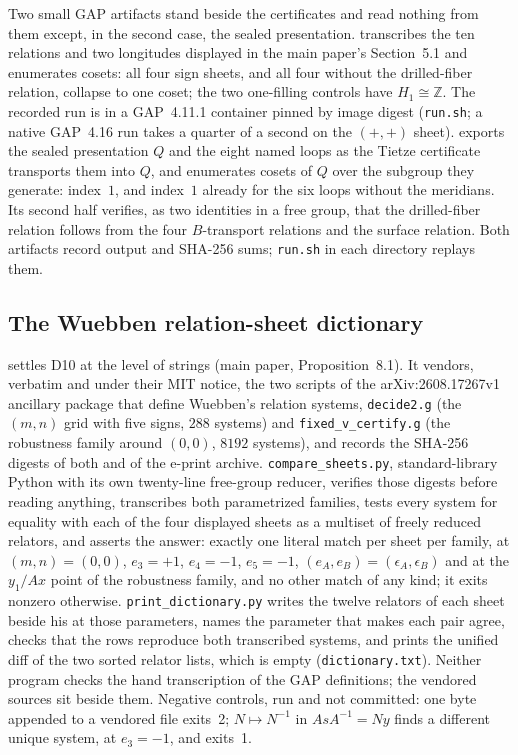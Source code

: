 \documentclass[11pt]{article}
\newcommand{\Z}{\mathbb{Z}}
\theoremstyle{definition}
\begin{document}
Two small GAP artifacts stand beside the certificates and read nothing from
them except, in the second case, the sealed presentation.
transcribes the ten relations and two longitudes displayed in the main
paper's Section~5.1 and enumerates cosets: all four sign sheets, and all
four without the drilled-fiber relation, collapse to one coset; the two
one-filling controls have $H_1\cong\Z$.  The recorded run is in a GAP~4.11.1
container pinned by image digest (\texttt{run.sh}; a native GAP~4.16 run
takes a quarter of a second on the $(+,+)$ sheet).
 exports the
sealed presentation $Q$ and the eight named loops as the Tietze certificate
transports them into $Q$, and enumerates cosets of $Q$ over the subgroup
they generate: index~$1$, and index~$1$ already for the six loops without
the meridians.  Its second half verifies, as two identities in a free group,
that the drilled-fiber relation follows from the four $B$-transport
relations and the surface relation.  Both artifacts record output and
SHA-256 sums; \texttt{run.sh} in each directory replays them.

\subsection{The Wuebben relation-sheet dictionary}
\label{sec:dictionary-artifact}

 settles D10 at the
level of strings (main paper, Proposition~8.1).  It vendors, verbatim and
under their MIT notice, the two scripts of the arXiv:2608.17267v1 ancillary
package that define Wuebben's relation systems, \texttt{decide2.g} (the
$(m,n)$ grid with five signs, $288$ systems) and \texttt{fixed\_v\_certify.g}
(the robustness family around $(0,0)$, $8192$ systems), and records the
SHA-256 digests of both and of the e-print archive.  \texttt{compare\_sheets.py},
standard-library Python with its own twenty-line free-group reducer, verifies
those digests before reading anything, transcribes both parametrized
families, tests every system for equality with each of the four displayed
sheets as a multiset of freely reduced relators, and asserts the answer:
exactly one literal match per sheet per family, at $(m,n)=(0,0)$,
$e_3=+1$, $e_4=-1$, $e_5=-1$, $(e_A,e_B)=(\epsilon_A,\epsilon_B)$ and at
the $y_1/Ax$ point of the robustness family, and no other match of any
kind; it exits nonzero otherwise.  \texttt{print\_dictionary.py} writes the
twelve relators of each sheet beside his at those parameters, names the
parameter that makes each pair agree, checks that the rows reproduce both
transcribed systems, and prints the unified diff of the two sorted relator
lists, which is empty (\texttt{dictionary.txt}).  Neither program checks the
hand transcription of the GAP definitions; the vendored sources sit beside
them.  Negative controls, run and not committed: one byte appended to a
vendored file exits~2; $N\mapsto N^{-1}$ in $AsA^{-1}=Ny$ finds a different
unique system, at $e_3=-1$, and exits~1.
\end{document}
